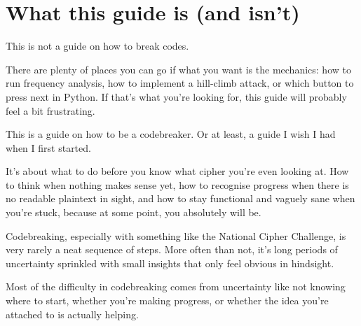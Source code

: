 \documentclass[12pt]{report}
\begin{document}
\maketitle


\begin{abstract}
\textit{The Hitchhiker's Guide to the Galaxy} is, among other things,
a book designed to help its reader navigate a universe that is
confusing, chaotic, and occasionally hostile. This guide has far more
modest ambitions: to help you remain at least somewhat functional while
staring at a block of ciphertext that appears to have been designed
specifically to ruin your evening. If there is one thing worth
remembering throughout the rest of this guide, it is the same advice
printed in large, friendly letters on the cover of the
\textit{Hitchhiker's Guide}:
\href{https://en.wikipedia.org/wiki/Phrases_from_The_Hitchhiker%27s_Guide_to_the_Galaxy#Don't_Panic}{\textbf{DON'T PANIC}}.
\end{abstract}


\chapter*{What this guide is (and isn't)}
\thispagestyle{plain}

This is not a guide on how to break codes.

There are plenty of places you can go if what you want is the mechanics: how to run frequency analysis, how to implement a hill-climb attack, or which button to press next in Python. If that's what you're looking for, this guide will probably feel a bit frustrating.

This is a guide on how to be a codebreaker. Or at least, a guide I wish I had when I first started.

It's about what to do before you know what cipher you're even looking at. How to think when nothing makes sense yet, how to recognise progress when there is no readable plaintext in sight, and how to stay functional and vaguely sane when you're stuck, because at some point,
you absolutely will be.

Codebreaking, especially with something like the National Cipher Challenge, is very rarely a neat sequence of steps. More often than not, it's long periods of uncertainty sprinkled with small insights that only feel obvious in hindsight.

Most of the difficulty in codebreaking comes from uncertainty like not knowing where to start, whether you're making progress, or whether the idea you're attached to is actually helping.
\end{document}
